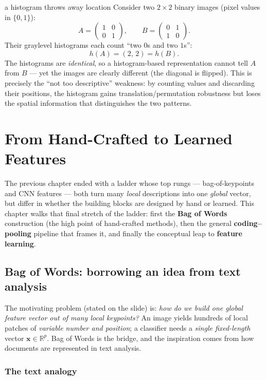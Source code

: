 \documentclass{report}
\newcommand{\R}{\mathbb{R}}
\newcommand{\xvec}{\mathbf{x}}
\begin{document}
\begin{exbox}{a histogram throws away location}
Consider two $2\times2$ binary images (pixel values in $\{0,1\}$):
\[
A=\begin{pmatrix}1&0\\0&1\end{pmatrix},
\qquad
B=\begin{pmatrix}0&1\\1&0\end{pmatrix}.
\]
Their graylevel histograms each count ``two $0$s and two $1$s'':
\[
h(A) = (2,\,2) = h(B).
\]
The histograms are \emph{identical}, so a histogram-based representation
cannot tell $A$ from $B$ --- yet the images are clearly different (the
diagonal is flipped). This is precisely the ``not too descriptive'' weakness:
by counting values and discarding their positions, the histogram gains
translation/permutation robustness but loses the spatial information that
distinguishes the two patterns.
\end{exbox}


\section{From Hand-Crafted to Learned Features}

The previous chapter ended with a ladder whose top rungs --- bag-of-keypoints
and CNN features --- both turn many \emph{local} descriptions into one
\emph{global} vector, but differ in whether the building blocks are designed by
hand or learned. This chapter walks that final stretch of the ladder: first the
\textbf{Bag of Words} construction (the high point of hand-crafted methods),
then the general \textbf{coding--pooling} pipeline that frames it, and finally
the conceptual leap to \textbf{feature learning}.

\subsection{Bag of Words: borrowing an idea from text analysis}

The motivating problem (stated on the slide) is: \emph{how do we build one
global feature vector out of many local keypoints?} An image yields hundreds of
local patches of \emph{variable number and position}; a classifier needs a
\emph{single fixed-length} vector $\xvec \in \R^p$. Bag of Words is the bridge,
and the inspiration comes from how documents are represented in text analysis.

\subsubsection{The text analogy}
\end{document}

